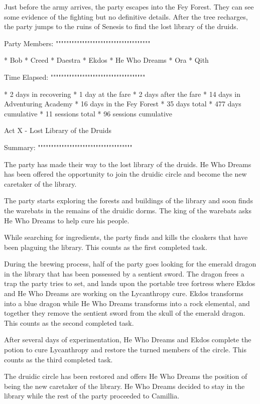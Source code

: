 Just before the army arrives, the party escapes into the Fey Forest.
They can see some evidence of the fighting but no definitive details.
After the tree recharges, the party jumps to the ruins of Senesis to find the lost library of the druids.

Party Members:
""""""""""""""""""""""""""""""""""""

  * Bob
  * Creed
  * Daestra
  * Ekdos
  * He Who Dreams
  * Ora
  * Qith

Time Elapsed:
""""""""""""""""""""""""""""""""""""

  * 2 days in recovering
  * 1 day at the fare
  * 2 days after the fare
  * 14 days in Adventuring Academy
  * 16 days in the Fey Forest
  * 35 days total
  * 477 days cumulative
  * 11 sessions total
  * 96 sessions cumulative

Act X - Lost Library of the Druids
^^^^^^^^^^^^^^^^^^^^^^^^^^^^^^^^^^^^

Summary:
""""""""""""""""""""""""""""""""""""

The party has made their way to the lost library of the druids.
He Who Dreams has been offered the opportunity to join the druidic circle and become the new caretaker of the library.

The party starts exploring the forests and buildings of the library and soon finds the warebats in the remains of the druidic dorms.
The king of the warebats asks He Who Dreams to help cure his people.

While searching for ingredients, the party finds and kills the cloakers that have been plaguing the library.
This counts as the first completed task.

During the brewing process, half of the party goes looking for the emerald dragon in the library that has been possessed by a sentient sword.
The dragon frees a trap the party tries to set, and lands upon the portable tree fortress where Ekdos and He Who Dreams are working on the Lycanthropy cure.
Ekdos transforms into a blue dragon while He Who Dreams transforms into a rock elemental, and together they remove the sentient sword from the skull of the emerald dragon.
This counts as the second completed task.

After several days of experimentation, He Who Dreams and Ekdos complete the potion to cure Lycanthropy and restore the turned members of the circle.
This counts as the third completed task.

The druidic circle has been restored and offers He Who Dreams the position of being the new caretaker of the library.
He Who Dreams decided to stay in the library while the rest of the party proceeded to Camillia.

